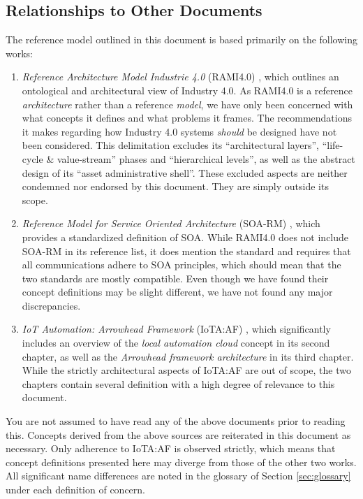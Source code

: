 \subsection{Relationships to Other Documents}
\label{sec:introduction:relationships}

The reference model outlined in this document is based primarily on the following works:

\begin{enumerate}
\item \textit{Reference Architecture Model Industrie 4.0} (RAMI4.0) \cite{adolphs2016reference}, which outlines an ontological and architectural view of Industry 4.0.
As RAMI4.0 is a reference \textit{architecture} rather than a reference \textit{model}, we have only been concerned with what concepts it defines and what problems it frames.
The recommendations it makes regarding how Industry 4.0 systems \textit{should} be designed have not been considered.
This delimitation excludes its ``architectural layers'', ``life-cycle \& value-stream'' phases and ``hierarchical levels'', as well as the abstract design of its ``asset administrative shell''.
These excluded aspects are neither condemned nor endorsed by this document.
They are simply outside its scope.

\item \textit{Reference Model for Service Oriented Architecture} (SOA-RM) \cite{mackenzie2006reference}, which provides a standardized definition of SOA.
While RAMI4.0 does not include SOA-RM in its reference list, it does mention the standard and requires that all communications adhere to SOA principles, which should mean that the two standards are mostly compatible.
Even though we have found their concept definitions may be slight different, we have not found any major discrepancies.

\item \textit{IoT Automation: Arrowhead Framework} (IoTA:AF) \cite{delsing2017iot}, which significantly includes an overview of the \textit{local automation cloud} concept in its second chapter, as well as the \textit{Arrowhead framework architecture} in its third chapter.
While the strictly architectural aspects of IoTA:AF are out of scope, the two chapters contain several definition with a high degree of relevance to this document.

\end{enumerate}

You are not assumed to have read any of the above documents prior to reading this.
Concepts derived from the above sources are reiterated in this document as necessary.
Only adherence to IoTA:AF is observed strictly, which means that concept definitions presented here may diverge from those of the other two works.
All significant name differences are noted in the glossary of Section \ref{sec:glossary} under each definition of concern.

